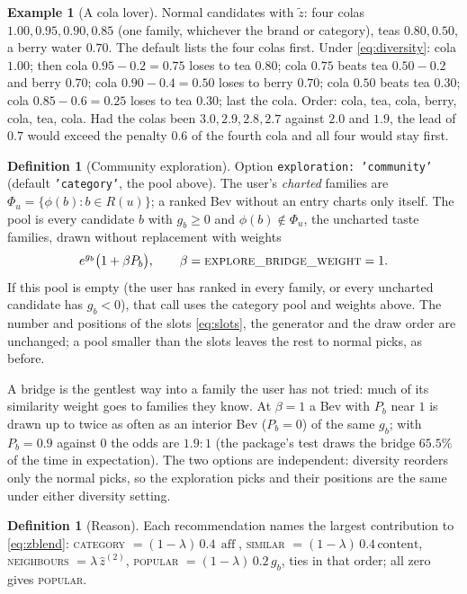 \documentclass[11pt]{article}
\DeclareMathOperator{\aff}{aff}
\newcommand{\code}[1]{\texttt{#1}}
\newcommand{\zhat}{\hat{z}}
\theoremstyle{plain}
\theoremstyle{definition}
\newtheorem{definition}[theorem]{Definition}
\newtheorem{example}[theorem]{Example}
\theoremstyle{remark}
\begin{document}
\begin{example}[A cola lover]\label{ex:diversity}
Normal candidates with $\tilde z$: four colas $1.00, 0.95, 0.90, 0.85$ (one family, whichever the brand or category), teas $0.80, 0.50$, a berry water $0.70$. The default lists the four colas first. Under \eqref{eq:diversity}: cola $1.00$; then cola $0.95 - 0.2 = 0.75$ loses to tea $0.80$; cola $0.75$ beats tea $0.50 - 0.2$ and berry $0.70$; cola $0.90 - 0.4 = 0.50$ loses to berry $0.70$; cola $0.50$ beats tea $0.30$; cola $0.85 - 0.6 = 0.25$ loses to tea $0.30$; last the cola. Order: cola, tea, cola, berry, cola, tea, cola. Had the colas been $3.0, 2.9, 2.8, 2.7$ against $2.0$ and $1.9$, the lead of $0.7$ would exceed the penalty $0.6$ of the fourth cola and all four would stay first.
\end{example}

\begin{definition}[Community exploration]\label{def:communityexplore}
Option \code{exploration: 'community'} (default \code{'category'}, the pool above). The user's \emph{charted} families are $\Phi_u = \{\phi(b) : b \in R(u)\}$; a ranked Bev without an entry charts only itself. The pool is every candidate $b$ with $g_b \ge 0$ and $\phi(b) \notin \Phi_u$, the uncharted taste families, drawn without replacement with weights
\begin{equation}\label{eq:communityexplore}
e^{g_b} \bigl(1 + \beta P_b\bigr), \qquad \beta = \textsc{explore\_bridge\_weight} = 1.
\end{equation}
If this pool is empty (the user has ranked in every family, or every uncharted candidate has $g_b < 0$), that call uses the category pool and weights above. The number and positions of the slots \eqref{eq:slots}, the generator and the draw order are unchanged; a pool smaller than the slots leaves the rest to normal picks, as before.
\end{definition}

A bridge is the gentlest way into a family the user has not tried: much of its similarity weight goes to families they know. At $\beta = 1$ a Bev with $P_b$ near $1$ is drawn up to twice as often as an interior Bev ($P_b = 0$) of the same $g_b$; with $P_b = 0.9$ against $0$ the odds are $1.9 : 1$ (the package's test draws the bridge $65.5\%$ of the time in expectation). The two options are independent: diversity reorders only the normal picks, so the exploration picks and their positions are the same under either diversity setting.

\begin{definition}[Reason]
Each recommendation names the largest contribution to \eqref{eq:zblend}: \textsc{category} $= (1-\lambda)\,0.4\,\aff$, \textsc{similar} $= (1-\lambda)\,0.4\,\mathrm{content}$, \textsc{neighbours} $= \lambda\, \zhat^{(2)}$, \textsc{popular} $= (1-\lambda)\,0.2\, g_b$, ties in that order; all zero gives \textsc{popular}.
\end{definition}
\end{document}
